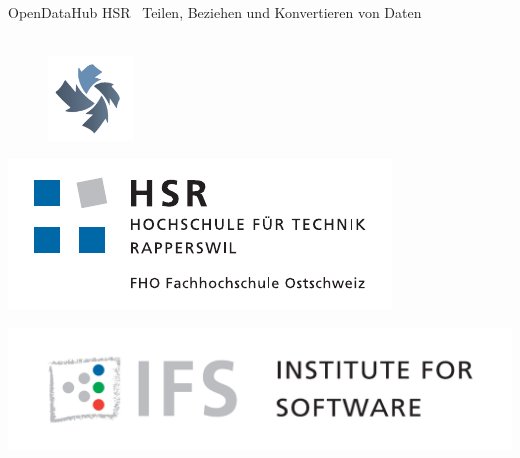 
\author{
	\rlif \\
	\and
	\chuf \\
	\and
	\fscf \\
}

\clearpage
\begin{titlepage}
	
	\begin{center}
		 \\
		 \\ [25pt]
		\hr{0.5pt} \\[0.2cm]
		\huge OpenDataHub HSR \textendash\ Teilen, Beziehen und Konvertieren von Daten \\
		\hr{2pt} \\[0.2cm]
		
		\begin{figure}[H]
			\centering
			\includegraphics[width=0.2\textwidth]{fig/opendatahub-logo}
		\end{figure}
		
		\begin{minipage}{0.4\textwidth}
			\includegraphics[width=\textwidth]{fig/hsr-logo}
		\end{minipage}
		\begin{minipage}{0.4\textwidth}
			\includegraphics[width=\textwidth]{fig/ifs-logo}
		\end{minipage}
		

\end{center}
\end{titlepage}
